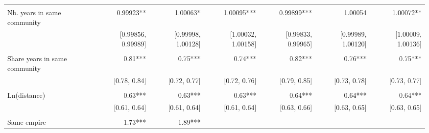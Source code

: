 \begin{table}[!h]
\begin{tabular}{lllllll}
  \multicolumn{1}{r}{} &
  \multicolumn{1}{r}{} \\
\multicolumn{1}{l}{Nb. years in same community} &
  \multicolumn{1}{|r}{0.99923**} &
  \multicolumn{1}{r}{1.00063*} &
  \multicolumn{1}{r}{1.00095***} &
  \multicolumn{1}{r}{0.99899***} &
  \multicolumn{1}{r}{1.00054} &
  \multicolumn{1}{r}{1.00072**} \\
\multicolumn{1}{l}{} &
  \multicolumn{1}{|r}{[0.99856, 0.99989]} &
  \multicolumn{1}{r}{[0.99998, 1.00128]} &
  \multicolumn{1}{r}{[1.00032, 1.00158]} &
  \multicolumn{1}{r}{[0.99833, 0.99965]} &
  \multicolumn{1}{r}{[0.99989, 1.00120]} &
  \multicolumn{1}{r}{[1.00009, 1.00136]} \\
\multicolumn{1}{l}{} &
  \multicolumn{1}{|r}{} &
  \multicolumn{1}{r}{} &
  \multicolumn{1}{r}{} &
  \multicolumn{1}{r}{} &
  \multicolumn{1}{r}{} &
  \multicolumn{1}{r}{} \\
\multicolumn{1}{l}{Share years in same community} &
  \multicolumn{1}{|r}{0.81***} &
  \multicolumn{1}{r}{0.75***} &
  \multicolumn{1}{r}{0.74***} &
  \multicolumn{1}{r}{0.82***} &
  \multicolumn{1}{r}{0.76***} &
  \multicolumn{1}{r}{0.75***} \\
\multicolumn{1}{l}{} &
  \multicolumn{1}{|r}{[0.78,    0.84]} &
  \multicolumn{1}{r}{[0.72,    0.77]} &
  \multicolumn{1}{r}{[0.72,    0.76]} &
  \multicolumn{1}{r}{[0.79,    0.85]} &
  \multicolumn{1}{r}{[0.73,    0.78]} &
  \multicolumn{1}{r}{[0.73,    0.77]} \\
\multicolumn{1}{l}{} &
  \multicolumn{1}{|r}{} &
  \multicolumn{1}{r}{} &
  \multicolumn{1}{r}{} &
  \multicolumn{1}{r}{} &
  \multicolumn{1}{r}{} &
  \multicolumn{1}{r}{} \\
\multicolumn{1}{l}{Ln(distance)} &
  \multicolumn{1}{|r}{0.63***} &
  \multicolumn{1}{r}{0.63***} &
  \multicolumn{1}{r}{0.63***} &
  \multicolumn{1}{r}{0.64***} &
  \multicolumn{1}{r}{0.64***} &
  \multicolumn{1}{r}{0.64***} \\
\multicolumn{1}{l}{} &
  \multicolumn{1}{|r}{[0.61,    0.64]} &
  \multicolumn{1}{r}{[0.61,    0.64]} &
  \multicolumn{1}{r}{[0.61,    0.64]} &
  \multicolumn{1}{r}{[0.63,    0.66]} &
  \multicolumn{1}{r}{[0.63,    0.65]} &
  \multicolumn{1}{r}{[0.63,    0.65]} \\
\multicolumn{1}{l}{} &
  \multicolumn{1}{|r}{} &
  \multicolumn{1}{r}{} &
  \multicolumn{1}{r}{} &
  \multicolumn{1}{r}{} &
  \multicolumn{1}{r}{} &
  \multicolumn{1}{r}{} \\
\multicolumn{1}{l}{Same empire} &
  \multicolumn{1}{|r}{1.73***} &
  \multicolumn{1}{r}{1.89***} &

\end{tabular}
\end{table}
